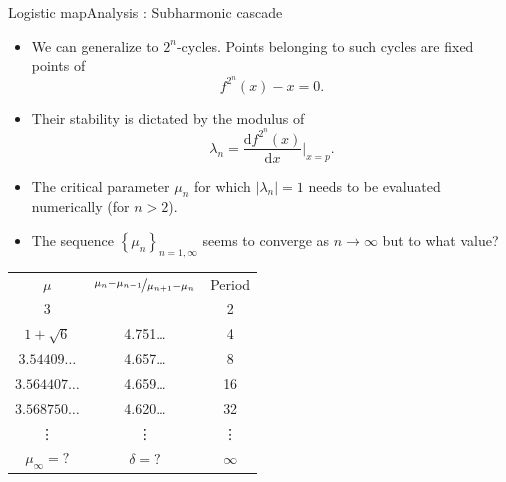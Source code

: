 \documentclass[usenames,dvipsnames,svgnames,10pt,aspectratio=169]{beamer}
\begin{document}
\begin{frame}[t, c]{Logistic map}{Analysis : Subharmonic cascade}
	\begin{minipage}{.48\textwidth}
		\begin{itemize}
			\item We can generalize to \( 2^n \)-cycles.
			Points belonging to such cycles are fixed points of
			\[
				f^{2^n}(x) - x = 0.
			\]

			\item Their stability is dictated by the modulus of
			\[
				\lambda_n = \displaystyle \frac{\mathrm{d} f^{2^n}(x)}{\mathrm{d}x} \Big\vert_{x=p}.
			\]

			\item The critical parameter \( \mu_n \) for which \( \vert \lambda_n \vert = 1 \) needs to be evaluated numerically (for \( n > 2 \)).

			\medskip

			\item The sequence \( \left\{ \mu_n \right\}_{n=1, \infty} \) seems to converge as \( n \to \infty \) but to what value?
		\end{itemize}
	\end{minipage}%
	\hfill
	\begin{minipage}{.48\textwidth}
		\centering
		\begin{tabular}{ccc}
			\( \mu \) & \(\nicefrac{\mu_{n} - \mu_{n-1}}{\mu_{n+1} - \mu_{n}} \) & Period \\
			\( 3 \) &  & 2 \\
			\( 1 + \sqrt{6} \) & 4.751\ldots & 4 \\
			\( 3.54409\ldots \) & 4.657\ldots & 8 \\
			\( 3.564407\ldots \) & 4.659\ldots & 16 \\
			\( 3.568750\ldots \) & 4.620\ldots & 32 \\
			\vdots & \vdots & \vdots \\
			\( \mu_{\infty} = ? \) & \( \delta = ? \) & \( \infty \) \\
		\end{tabular}
	\end{minipage}

	\vspace{1cm}
\end{frame}
\end{document}
